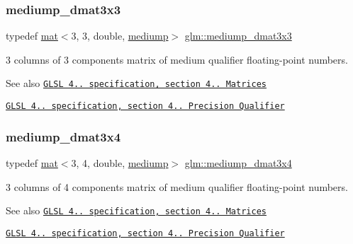 \subsubsection{\texorpdfstring{mediump\+\_\+dmat3x3}{mediump\_dmat3x3}}
{\footnotesize\ttfamily typedef \mbox{\hyperlink{structglm_1_1mat}{mat}}$<$3, 3, double, \mbox{\hyperlink{namespaceglm_a36ed105b07c7746804d7fdc7cc90ff25a6416f3ea0c9025fb21ed50c4d6620482}{mediump}}$>$ \mbox{\hyperlink{group__core__precision_ga8ecaed5443b0aa73bbe8683fcbb04f65}{glm\+::mediump\+\_\+dmat3x3}}}

3 columns of 3 components matrix of medium qualifier floating-\/point numbers.

\begin{DoxySeeAlso}{See also}
\href{http://www.opengl.org/registry/doc/GLSLangSpec.4.20.8.pdf}{\tt G\+L\+SL 4.. specification, section 4.. Matrices} 

\href{http://www.opengl.org/registry/doc/GLSLangSpec.4.20.8.pdf}{\tt G\+L\+SL 4.. specification, section 4.. Precision Qualifier} 
\end{DoxySeeAlso}
\mbox{\label{group__core__precision_ga8e38f500f63f5caed06699264acfb456}} 
\subsubsection{\texorpdfstring{mediump\+\_\+dmat3x4}{mediump\_dmat3x4}}
{\footnotesize\ttfamily typedef \mbox{\hyperlink{structglm_1_1mat}{mat}}$<$3, 4, double, \mbox{\hyperlink{namespaceglm_a36ed105b07c7746804d7fdc7cc90ff25a6416f3ea0c9025fb21ed50c4d6620482}{mediump}}$>$ \mbox{\hyperlink{group__core__precision_ga8e38f500f63f5caed06699264acfb456}{glm\+::mediump\+\_\+dmat3x4}}}

3 columns of 4 components matrix of medium qualifier floating-\/point numbers.

\begin{DoxySeeAlso}{See also}
\href{http://www.opengl.org/registry/doc/GLSLangSpec.4.20.8.pdf}{\tt G\+L\+SL 4.. specification, section 4.. Matrices} 

\href{http://www.opengl.org/registry/doc/GLSLangSpec.4.20.8.pdf}{\tt G\+L\+SL 4.. specification, section 4.. Precision Qualifier} 
\end{DoxySeeAlso}
\mbox{\label{group__core__precision_ga4b027f0f888d5ec1e77a00cb5517f56a}} 
